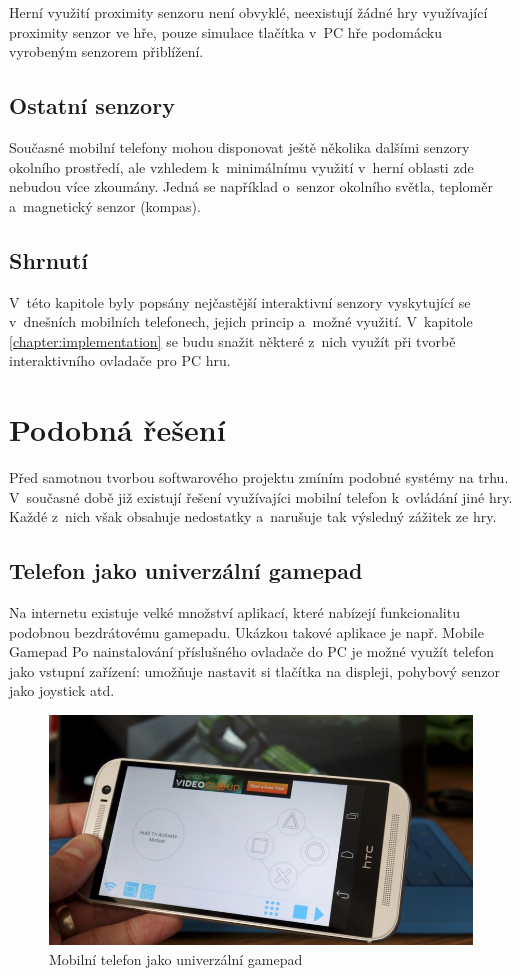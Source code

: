 \documentclass[thesis=B,czech,hidelinks]{FITthesis}[2012/06/26] %
\begin{document}
Herní využití proximity senzoru není obvyklé, neexistují žádné hry využívající proximity senzor ve hře, pouze simulace tlačítka v~PC hře podomácku vyrobeným senzorem přiblížení. \cite{proximitygame}

\section{Ostatní senzory}

Současné mobilní telefony mohou disponovat ještě několika dalšími senzory okolního prostředí, ale vzhledem k~minimálnímu využití v~herní oblasti zde nebudou více zkoumány. Jedná se například o~senzor okolního světla, teploměr a~magnetický senzor (kompas). 

\section{Shrnutí}

V~této kapitole byly popsány nejčastější interaktivní senzory vyskytující se v~dnešních mobilních telefonech, jejich princip a~možné využití. V~kapitole \ref{chapter:implementation} se budu snažit některé z~nich využít při tvorbě interaktivního ovladače pro PC hru. 

\chapter{Podobná řešení}

Před samotnou tvorbou softwarového projektu zmíním podobné systémy na trhu. V~současné době již existují řešení využívajíci mobilní telefon k~ovládání jiné hry. Každé z~nich však obsahuje nedostatky a~narušuje tak výsledný zážitek ze hry.

\section{Telefon jako univerzální gamepad}

Na internetu existuje velké množství aplikací, které nabízejí funkcionalitu podobnou bezdrátovému gamepadu. Ukázkou takové aplikace je např. Mobile Gamepad \cite{mobilegamepad} Po nainstalování příslušného ovladače do PC je možné využít telefon jako vstupní zařízení: umožňuje nastavit si tlačítka na displeji, pohybový senzor jako joystick atd.

\begin{figure}[h]
\includegraphics[width=\textwidth]{mobile_gamepad}
\caption{Mobilní telefon jako univerzální gamepad\cite{mobilegamepad}}
\end{figure}
\end{document}
